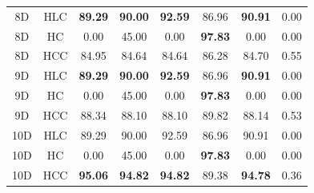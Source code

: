 \begin{table}[htbp]
{\begin{tabular}{|c|c|c|c|c|c|c|c|}
\hline
8D & HLC & \textbf{89.29} & \textbf{90.00} & \textbf{92.59} & 86.96 & \textbf{90.91} & 0.00 \\
8D & HC & 0.00 & 45.00 & 0.00 & \textbf{97.83} & 0.00 & 0.00 \\
8D & HCC & 84.95 & 84.64 & 84.64 & 86.28 & 84.70 & 0.55 \\
\hline
9D & HLC & \textbf{89.29} & \textbf{90.00} & \textbf{92.59} & 86.96 & \textbf{90.91} & 0.00 \\
9D & HC & 0.00 & 45.00 & 0.00 & \textbf{97.83} & 0.00 & 0.00 \\
9D & HCC & 88.34 & 88.10 & 88.10 & 89.82 & 88.14 & 0.53 \\
\hline
10D & HLC & 89.29 & 90.00 & 92.59 & 86.96 & 90.91 & 0.00 \\
10D & HC & 0.00 & 45.00 & 0.00 & \textbf{97.83} & 0.00 & 0.00 \\
10D & HCC & \textbf{95.06} & \textbf{94.82} & \textbf{94.82} & 89.38 & \textbf{94.78} & 0.36 \\
\hline
\end{tabular}
}%
\end{table}




